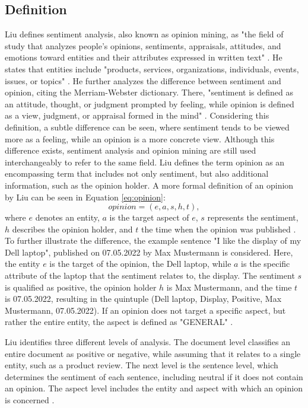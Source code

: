 \subsection{Definition}


Liu defines sentiment analysis, also known as opinion mining, as "the field of study that analyzes people's opinions, sentiments, appraisals, attitudes, and emotions toward entities and their attributes expressed in written text" \cite[p.~1]{liu_2015}. He states that entities include "products, services, organizations, individuals, events, issues, or topics" \cite[p.~1]{liu_2015}. He further analyzes the difference between sentiment and opinion, citing the Merriam-Webster dictionary. There, "sentiment is defined as an attitude, thought, or judgment prompted by feeling, while opinion is defined as a view, judgment, or appraisal formed in the mind" \cite[p.~2]{liu_2015}. Considering this definition, a subtle difference can be seen, where sentiment tends to be viewed more as a feeling, while an opinion is a more concrete view. Although this difference exists, sentiment analysis and opinion mining are still used interchangeably to refer to the same field. Liu defines the term opinion as an encompassing term that includes not only sentiment, but also additional information, such as the opinion holder. A more formal definition of an opinion by Liu can be seen in Equation \eqref{eq:opinion}:
\begin{equation}
    opinion = (e, a, s, h, t),
    \label{eq:opinion}
\end{equation}
where $e$ denotes an entity, $a$ is the target aspect of $e$, $s$ represents the sentiment, $h$ describes the opinion holder, and $t$ the time when the opinion was published \cite{liu_2015}. To further illustrate the difference, the example sentence "I like the display of my Dell laptop", published on 07.05.2022 by Max Mustermann is considered. Here, the entity $e$ is the target of the opinion, the Dell laptop, while $a$ is the specific attribute of the laptop that the sentiment relates to, the display. The sentiment $s$ is qualified as positive, the opinion holder $h$ is Max Mustermann, and the time $t$ is 07.05.2022, resulting in the quintuple (Dell laptop, Display, Positive, Max Mustermann, 07.05.2022). If an opinion does not target a specific aspect, but rather the entire entity, the aspect is defined as "GENERAL" \cite{liu_2015}. 


Liu identifies three different levels of analysis. The document level classifies an entire document as positive or negative, while assuming that it relates to a single entity, such as a product review. The next level is the sentence level, which determines the sentiment of each sentence, including neutral if it does not contain an opinion. The aspect level includes the entity and aspect with which an opinion is concerned \cite{liu_2015}.

